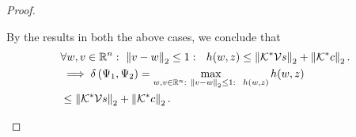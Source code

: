 \begin{proof}
\begin{enumerate}
  By the results in both the above cases, we conclude that
  \begin{align*}
& \forall w,v\in\mathbb{R}^n:~\left\|v-w\right\|_{2}\leq 1:~~h(w,z)\leq
    \left\|\mathcal{K}^*\mathcal{V}s\right\|_{2}+\left\|\mathcal{K}^*c\right\|_{2}.\\
& \implies \delta\left(\Psi_1,\Psi_2\right)=\max_{w,v\in\mathbb{R}^n:~\left\|v-w\right\|_{2}\leq
      1:~~h(w,z)}h(w,z)\\
&  \leq \left\|\mathcal{K}^*\mathcal{V}s\right\|_{2}+\left\|\mathcal{K}^*c\right\|_{2}.~~~~~~~~~~~\qedhere
  \end{align*}
\end{enumerate}
%
\end{proof}
%




























